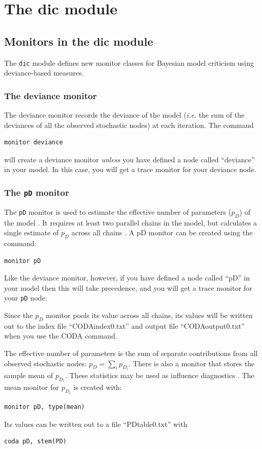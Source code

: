 \documentclass[11pt, a4paper, titlepage]{report}
\begin{document}
\chapter{The dic module}
\label{chapter:dic}

\section{Monitors in the dic module}

The \texttt{dic} module defines new monitor classes for Bayesian model
criticism using deviance-based measures. 

\subsection{The deviance monitor}

The deviance monitor records the deviance of the model ({\em i.e.} the
sum of the deviances of all the observed stochastic nodes) at each
iteration. The command
\begin{verbatim}
monitor deviance
\end{verbatim}
will create a deviance monitor {\em unless} you have defined a node
called ``deviance'' in your model. In this case, you will get a trace
monitor for your deviance node.

\subsection{The \texttt{pD} monitor}

The \verb+pD+ monitor is used to estimate the effective number of
parameters ($p_D$) of the model \citep{spiegelhalter:etal:2002}. It
requires at least two parallel chains in the model, but calculates
a single estimate of $p_D$ across all chains \citep{plummer:2002}.
A pD monitor can be created using the command:
\begin{verbatim}
monitor pD
\end{verbatim}
Like the deviance monitor, however, if you have defined a node called
``pD'' in your model then this will take precedence, and you will get
a trace monitor for your \verb+pD+ node.

Since the $p_D$ monitor pools its value across all chains, its values
will be written out to the index file ``CODAindex0.txt'' and
output file ``CODAoutput0.txt'' when you use the CODA command.

The effective number of parameters is the sum of separate contributions
from all observed stochastic nodes: $p_D = \sum_i p_{D_i}$. There is
also a monitor that stores the sample mean of $p_{D_i}$. These statistics
may be used as influence diagnostics \citep{spiegelhalter:etal:2002}.
The mean monitor for $p_{D_i}$ is created with:
\begin{verbatim}
monitor pD, type(mean)
\end{verbatim}
Its values can be written out to a file ``PDtable0.txt'' with
\begin{verbatim}
coda pD, stem(PD)
\end{verbatim}
\end{document}
